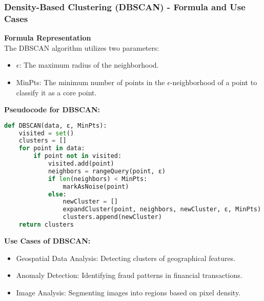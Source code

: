 \documentclass[aspectratio=169]{beamer}
\begin{document}
\begin{frame}[fragile]
    \frametitle{Density-Based Clustering (DBSCAN) - Formula and Use Cases}
    \textbf{Formula Representation} \\

    The DBSCAN algorithm utilizes two parameters:
    \begin{itemize}
        \item $\epsilon$: The maximum radius of the neighborhood.
        \item MinPts: The minimum number of points in the $\epsilon$-neighborhood of a point to classify it as a core point.
    \end{itemize}

    \textbf{Pseudocode for DBSCAN:}
    \begin{lstlisting}[language=Python]
def DBSCAN(data, ε, MinPts):
    visited = set()
    clusters = []
    for point in data:
        if point not in visited:
            visited.add(point)
            neighbors = rangeQuery(point, ε)
            if len(neighbors) < MinPts:
                markAsNoise(point)
            else:
                newCluster = []
                expandCluster(point, neighbors, newCluster, ε, MinPts)
                clusters.append(newCluster)
    return clusters
    \end{lstlisting}

    \textbf{Use Cases of DBSCAN:}
    \begin{itemize}
        \item Geospatial Data Analysis: Detecting clusters of geographical features.
        \item Anomaly Detection: Identifying fraud patterns in financial transactions.
        \item Image Analysis: Segmenting images into regions based on pixel density.
    \end{itemize}
\end{frame}
\end{document}
